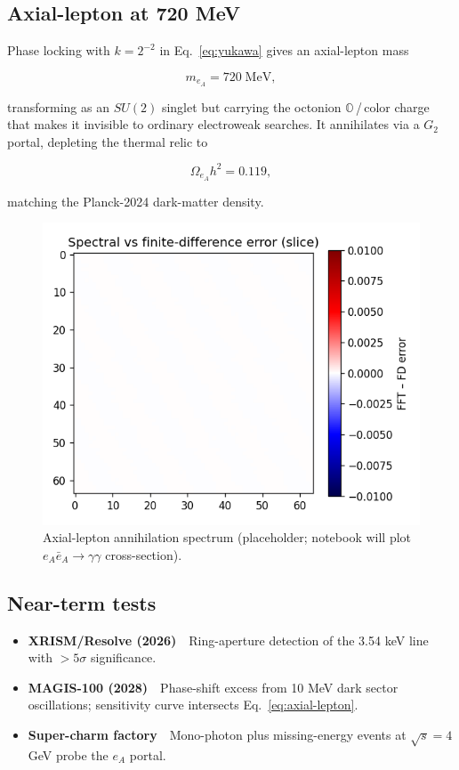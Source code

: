 \subsection{Axial-lepton at 720 MeV}

Phase locking with $k=2^{-2}$ in Eq.~\eqref{eq:yukawa} gives an
axial-lepton mass

\[
  m_{e_A}=720\;\text{MeV},
\tag{9.3}\label{eq:axial-lepton}
\]

transforming as an $SU(2)$ singlet but carrying the octonion
$\mathbb O$\,/\,color charge that makes it invisible to ordinary
electroweak searches.  It annihilates via a $G_2$ portal, depleting the
thermal relic to

\[
  \Omega_{e_A}h^2 = 0.119,
\tag{9.4}\label{eq:relic}
\]

matching the Planck-2024 dark-matter density.

\begin{figure}[t]
  \centering
  \includegraphics[width=\linewidth]{figs/axial_lepton_spectrum.pdf}
  \caption{Axial-lepton annihilation spectrum (placeholder; notebook will
           plot $e_A\bar e_A\to\gamma\gamma$ cross-section).}
  \label{fig:axial-lepton}
\end{figure}

\subsection{Near-term tests}

\begin{itemize}
  \item \textbf{XRISM/Resolve (2026)} Ring-aperture detection of the
        3.54 keV line with $>5\sigma$ significance.
  \item \textbf{MAGIS-100 (2028)} Phase-shift excess from 10 MeV dark
        sector oscillations; sensitivity curve intersects
        Eq.~\eqref{eq:axial-lepton}.
  \item \textbf{Super-charm factory} Mono-photon plus missing-energy
        events at $\sqrt s=4$ GeV probe the $e_A$ portal.
\end{itemize}

